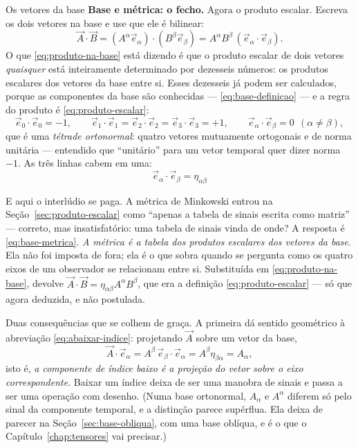 \documentclass[12pt,a4paper,oneside]{book}
\theoremstyle{rgplain}
\theoremstyle{rgremark}
\begin{document}
\begin{interludio}{Os vetores da base}
\textbf{Base e métrica: o fecho.} Agora o produto escalar. Escreva os dois
vetores na base e use que ele é bilinear:
\begin{equation}
  \vec A\cdot\vec B=(A^\alpha\vec e_\alpha)\cdot(B^\beta\vec e_\beta)
   =A^\alpha B^\beta\,(\vec e_\alpha\cdot\vec e_\beta).
  \label{eq:produto-na-base}
\end{equation}
O que \eqref{eq:produto-na-base} está dizendo é que o produto escalar de dois
vetores \emph{quaisquer} está inteiramente determinado por dezesseis números:
os produtos escalares dos vetores da base entre si. Esses dezesseis já podem
ser calculados, porque as componentes da base são conhecidas ---
\eqref{eq:base-definicao} --- e a regra do produto é
\eqref{eq:produto-escalar}:
\[
  \vec e_0\cdot\vec e_0=-1,\qquad
  \vec e_1\cdot\vec e_1=\vec e_2\cdot\vec e_2=\vec e_3\cdot\vec e_3=+1,
  \qquad
  \vec e_\alpha\cdot\vec e_\beta=0\ \ (\alpha\neq\beta),
\]
que é uma \emph{tétrade ortonormal}: quatro vetores mutuamente ortogonais e de
norma unitária --- entendido que ``unitário'' para um vetor temporal quer
dizer norma $-1$. As três linhas cabem em uma:
\begin{equation}
  \boxed{\ \vec e_\alpha\cdot\vec e_\beta=\eta_{\alpha\beta}\ }
  \label{eq:base-metrica}
\end{equation}

E aqui o interlúdio se paga. A métrica de Minkowski entrou na
Seção~\ref{sec:produto-escalar} como ``apenas a tabela de sinais escrita como
matriz'' --- correto, mas insatisfatório: uma tabela de sinais vinda de onde?
A resposta é \eqref{eq:base-metrica}. \emph{A métrica é a tabela dos produtos
escalares dos vetores da base.} Ela não foi imposta de fora; ela é o que
sobra quando se pergunta como os quatro eixos de um observador se relacionam
entre si. Substituída em \eqref{eq:produto-na-base}, devolve
$\vec A\cdot\vec B=\eta_{\alpha\beta}A^\alpha B^\beta$, que era a definição
\eqref{eq:produto-escalar} --- só que agora deduzida, e não postulada.

Duas consequências que se colhem de graça. A primeira dá sentido geométrico à
abreviação \eqref{eq:abaixar-indice}: projetando $\vec A$ sobre um vetor da
base,
\[
  \vec A\cdot\vec e_\alpha=A^\beta\,\vec e_\beta\cdot\vec e_\alpha
   =A^\beta\eta_{\beta\alpha}=A_\alpha ,
\]
isto é, \emph{a componente de índice baixo é a projeção do vetor sobre o eixo
correspondente}. Baixar um índice deixa de ser uma manobra de sinais e passa a
ser uma operação com desenho. (Numa base ortonormal, $A_\alpha$ e $A^\alpha$
diferem só pelo sinal da componente temporal, e a distinção parece supérflua.
Ela deixa de parecer na Seção~\ref{sec:base-obliqua}, com uma base oblíqua, e
é o que o Capítulo~\ref{chap:tensores} vai precisar.)


\end{interludio}
\end{document}
